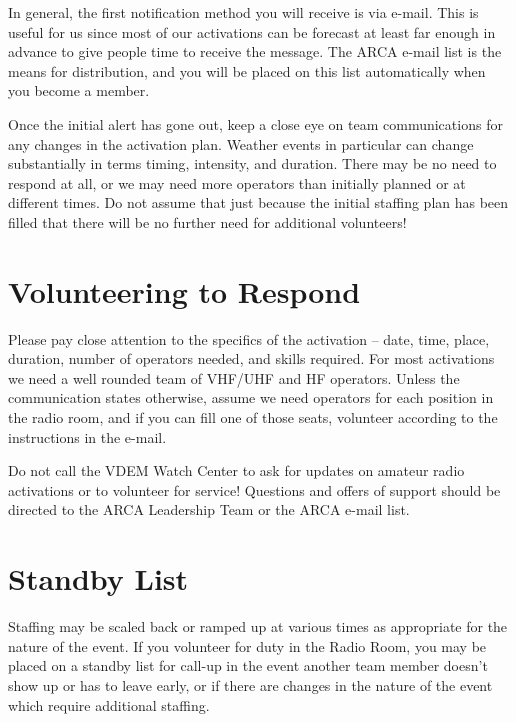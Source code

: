 \documentclass[pdflatex,letterpaper,twoside,12pt]{book}
\begin{document}
In general, the first notification method you will receive is via e-mail.  This is useful for us since most of our activations can be forecast at least far enough in advance to give people time to receive the message.  The ARCA e-mail list is the means for distribution, and you will be placed on this list automatically when you become a member.

Once the initial alert has gone out, keep a close eye on team communications for any changes in the activation plan.  Weather events in particular can change substantially in terms timing, intensity, and duration.  There may be no need to respond at all, or we may need more operators than initially planned or at different times.  Do not assume that just because the initial staffing plan has been filled that there will be no further need for additional volunteers!


\section{Volunteering to Respond}

Please pay close attention to the specifics of the activation – date, time, place, duration, number of operators needed, and skills required.  For most activations we need a well rounded team of VHF/UHF and HF operators.  Unless the communication states otherwise, assume we need operators for each position in the radio room, and if you can fill one of those seats, volunteer according to the instructions in the e-mail.

Do not call the VDEM Watch Center to ask for updates on amateur radio activations or to volunteer for service!  Questions and offers of support should be directed to the ARCA Leadership Team or the ARCA e-mail list.


\section{Standby List}

Staffing may be scaled back or ramped up at various times as appropriate for the nature of the event.  If you volunteer for duty in the Radio Room, you may be placed on a standby list for call-up in the event another team member doesn't show up or has to leave early, or if there are changes in the nature of the event which require additional staffing.
\end{document}
